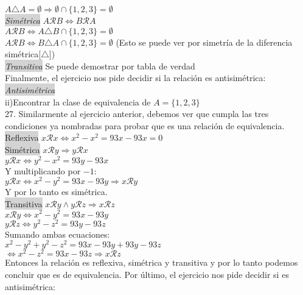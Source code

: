 \documentclass[a4paper,11pt]{article}
\begin{document}
\(A \triangle A =\emptyset \Rightarrow \emptyset \cap \{1,2,3\} = \emptyset\)\\
\colorbox{lightgray}{\textit{Simétrica}}  \(A \mathcal{R}B \Leftrightarrow B \mathcal{R} A\) \\
\(A \mathcal{R}B \Leftrightarrow A \triangle B \cap \{1,2,3\}=\emptyset\) \\
\(A \mathcal{R}B \Leftrightarrow B \triangle A \cap \{1,2,3\}=\emptyset\) (Esto se puede ver por simetría de la diferencia simétrica[\(\triangle\)])\\ 
\colorbox{lightgray}{\textit{Transitiva}} Se puede demostrar por tabla de verdad\\
Finalmente, el ejercicio nos pide decidir si la relación es antisimétrica:\\
\colorbox{lightgray}{\textit{Antisimétrica}}\\
ii)Encontrar la clase de equivalencia de \(A=\{1,2,3\}\)\\
27. Similarmente al ejercicio anterior, debemos ver que cumpla las tres condiciones ya nombradas para probar que es una relación de equivalencia. \\
\colorbox{lightgray}{Reflexiva} \(x \mathcal{R}x \Leftrightarrow x^2 - x^2 = 93x - 93x = 0 \) \\ 
\colorbox{lightgray}{Simétrica} \(x \mathcal{R}y \Rightarrow y \mathcal{R}x \) \\ 
\(y \mathcal{R}x \Leftrightarrow y^2 - x^2 = 93y - 93x \)\\
Y multiplicando por \(-1\):\\
\(y \mathcal{R}x \Leftrightarrow x^2 - y^2 = 93x - 93y \Rightarrow x \mathcal{R}y\)\\
Y por lo tanto es simétrica.\\
\colorbox{lightgray}{Transitiva} \(x \mathcal{R}y \land y\mathcal{R}z \Rightarrow x \mathcal{R}z\)\\
\(x \mathcal{R}y \Leftrightarrow x^2 - y^2 = 93x - 93y \)\\
\(y \mathcal{R}z \Leftrightarrow y^2 - z^2 = 93y - 93z \)\\
Sumando ambas ecuaciones:\\
\(x^2 - y^2 + y^2 - z^2 = 93x - 93y + 93y - 93z \)\\
\(\Leftrightarrow x^2 - z^2 = 93x - 93z \Rightarrow x \mathcal{R}z \)\\
Entonces la relación es reflexiva, simétrica y transitiva y por lo tanto podemos concluir que es de equivalencia.
Por último, el ejercicio nos pide decidir si es antisimétrica:\\
\end{document}

